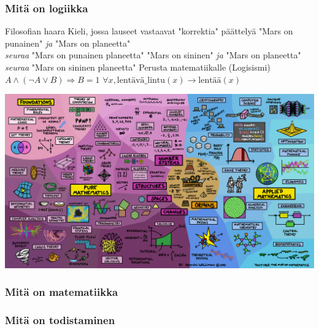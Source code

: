 \documentclass{beamer}
\begin{document}
\begin{frame}
  \frametitle{Mitä on logiikka}
  \begin{outline}
    \1 Filosofian haara
    \1 Kieli, jossa lauseet vastaavat "korrektia" päättelyä
      \2 "Mars on punainen" \emph{ja} "Mars on planeetta" \\ \emph{seuraa} "Mars on punainen planeetta"
      \2 "Mars on sininen" \emph{ja} "Mars on planeetta" \\ \emph{seuraa} "Mars on sininen planeetta"
    \1 Perusta matematiikalle (Logisismi)
    \1 $A \land (\neg A \lor B) \Rightarrow B = 1$
    \1 $\forall x, \text{lentävä\_lintu}(x) \to \text{lentää}(x)$
  \end{outline}
\end{frame}

{
    {%
        \includegraphics[width=\paperwidth,height=\paperheight]{./docs/static/map.png}
    }
\begin{frame}
\end{frame}
}

\begin{frame}
  \frametitle{Mitä on matematiikka}

\end{frame}

\begin{frame}
  \frametitle{Mitä on todistaminen}

\end{frame}
\end{document}
